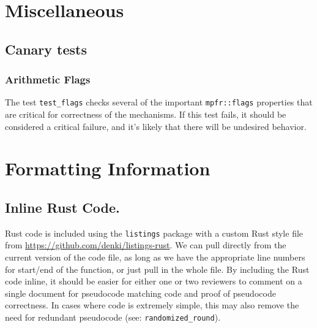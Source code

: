 \documentclass[11pt]{article}
\theoremstyle{definition}
\begin{document}
\section{Miscellaneous}\label{section:misc}
\subsection{Canary tests}
\subsubsection{Arithmetic Flags}
The test {\tt test\_flags} checks several of the important {\tt mpfr::flags} properties that are critical for correctness of the mechanisms. If this test fails, it should be considered a critical failure, and it's likely that there will be undesired behavior. 

\appendix
\section{Formatting Information}
\subsection{Inline Rust Code.}
Rust code is included using the \texttt{listings} package with a custom Rust style file from \url{https://github.com/denki/listings-rust}. We can pull directly from the current version of the code file, as long as we have the appropriate line numbers for start/end of the function, or just pull in the whole file. By including the Rust code inline, it should be easier for either one or two reviewers to comment on a single document for pseudocode matching code and proof of pseudocode correctness. In cases where code is extremely simple, this may also remove the need for redundant pseudocode (see: \texttt{randomized\_round}).
\end{document}
